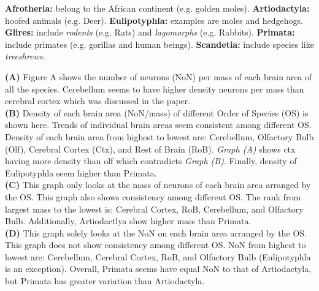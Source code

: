 \documentclass[landscape,final,paperwidth=48in,paperheight=48in,fontscale=0.285]{baposter}
\begin{document}
\begin{poster}
    {
    \smaller
    \noindent \textbf{Afrotheria:} belong to the African continent (e.g. golden moles). \textbf{Artiodactyla:} hoofed animals (e.g. Deer). \textbf{Eulipotyphla:} examples are moles and hedgehogs. \textbf{Glires:} include \textit{rodents} (e.g. Rats) and \textit{lagomorphs} (e.g. Rabbits). \textbf{ Primata:} include primates (e.g. gorillas and human beings). \textbf{Scandetia:} include species like \textit{treeshrews}.
    \par \noindent \textbf{(A)} Figure A shows the number of neurons (NoN) per mass of each brain area of all the species. Cerebellum seems to have higher density neurons per mass than cerebral cortex which was discussed in the paper. \\
    \noindent \textbf{(B)} Density of each brain area (NoN/mass) of different Order of Species (OS) is shown here. Trends of individual brain areas seem consistent among different OS. Density of each brain area from highest to lowest are: Cerebellum, Olfactory Bulb (Olf), Cerebral Cortex (Ctx), and Rest of Brain (RoB). \textit{Graph (A)} shows ctx having more density than olf which contradicts  \textit{Graph (B)}. Finally, density of Eulipotyphla seem higher than Primata. \\
    \noindent \textbf{(C)} This graph only looks at the mass of neurons of each brain area arranged by the OS. This graph also shows consistency among different OS. The rank from largest mass to the lowest is: Cerebral Cortex, RoB, Cerebellum, and Olfactory Bulb. Additionally, Artiodactlya show higher mass than Primata. \\
    \noindent \textbf{(D)} This graph solely looks at the NoN on each brain area arranged by the OS. This graph does not show consistency among different OS. NoN from highest to lowest are: Cerebellum, Cerebral Cortex, RoB, and Olfactory Bulb (Eulipotyphla is an exception). Overall, Primata seems have equal NoN to that of Artiodactyla, but Primata has greater variation than Artiodactyla.
}




\end{poster}
\end{document}
